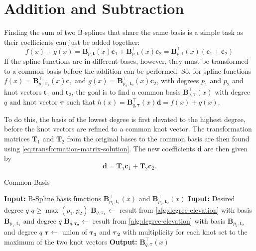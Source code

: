 \section{Addition and Subtraction}
Finding the sum of two B-splines that share the same basis is a simple task as their coefficients can just be added together:
\begin{equation}
    f(x) + g(x) =  \mathbf{B}_{p, \mathbf{t}}^{\top}(x) \mathbf{c}_1 + \mathbf{B}_{p, \mathbf{t}}^{\top}(x) \mathbf{c}_2
    = \mathbf{B}_{p, \mathbf{t}}^{\top}(x)(\mathbf{c}_1 + \mathbf{c}_2)
\end{equation}
If the spline functions are in different bases, however, they must be transformed to a common basis before the addition can be performed. So, for spline functions $f(x) = \mathbf{B}_{p_1, \mathbf{t}_1}^{\top}(x) \mathbf{c}_1$ and $g(x) = \mathbf{B}_{p_2, \mathbf{t}_2}^{\top}(x) \mathbf{c}_2$, with degrees $p_1$ and $p_2$ and knot vectors $\mathbf{t}_1$ and $\mathbf{t}_2$, the goal is to find a common basis $\mathbf{B}_{q, \boldsymbol{\tau}}^{\top}(x)$ with degree $q$ and knot vector $\boldsymbol{\tau}$ such that $h(x) = \mathbf{B}_{q, \boldsymbol{\tau}}^{\top}(x) \mathbf{d} = f(x) + g(x)$.

To do this, the basis of the lowest degree is first elevated to the highest degree, before the knot vectors are refined to a common knot vector. The transformation matrices $\mathbf T_1$ and $\mathbf T_2$ from the original bases to the common basis are then found using \cref{eq:transformation-matrix-solution}. The new coefficients $\mathbf d$ are then given by
\begin{equation}
    \mathbf d = \mathbf T_1 \mathbf c_1 + \mathbf T_2 \mathbf c_2.
\end{equation}

\begin{algorithm}
    \caption{Common Basis}\label{alg:common-basis}
    \begin{algorithmic}[1]
        \State \textbf{Input:} B-Spline basis functions $\mathbf{B}_{p_1, \mathbf{t}_1}^{\top}(x)$ and $\mathbf{B}_{p_2, \mathbf{t}_2}^{\top}(x)$
        \State \textbf{Input:} Desired degree $q$
        \Ensure $q \geq \max(p_1, p_2)$
        \State $\mathbf B_{q, \boldsymbol{\tau_1}} \gets$ result from \cref{alg:degree-elevation} with basis $\mathbf{B}_{p_1, \mathbf{t}_1}$ and degree $q$
        \State $\mathbf B_{q, \boldsymbol{\tau_2}} \gets$ result from \cref{alg:degree-elevation} with basis $\mathbf{B}_{p_2, \mathbf{t}_2}$ and degree $q$
        \State $\boldsymbol{\tau} \gets$ union of $\boldsymbol{\tau_1}$ and $\boldsymbol{\tau_2}$ with multiplicity for each knot set to the maximum of the two knot vectors
        \State \textbf{Output:} $\mathbf B_{q, \boldsymbol{\tau}}^{\top}(x)$
    \end{algorithmic}
\end{algorithm}


